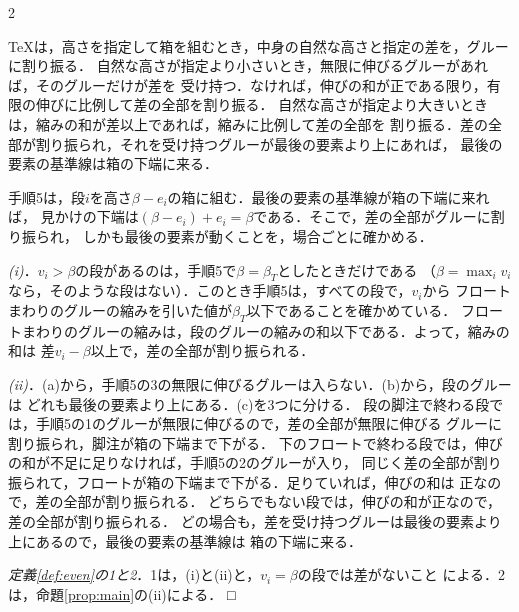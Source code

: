 \documentclass[paper=a4,fontsize=10pt]{jlreq}
\newcommand\kyocho[1]{{\gtfamily\itshape #1}}
\newenvironment{shoumei}{%
  \par\noindent{\gtfamily\sffamily 証明}\hspace{1\zw}\ignorespaces}
  {\unskip\nobreak\hfill □\par\addvspace{.5\baselineskip}}
\begin{document}
\begin{multicols}{2}
\begin{shoumei}
\TeX{}は，高さを指定して箱を組むとき，中身の自然な高さと指定の差を，グルーに割り振る．
自然な高さが指定より小さいとき，無限に伸びるグルーがあれば，そのグルーだけが差を
受け持つ．なければ，伸びの和が正である限り，有限の伸びに比例して差の全部を割り振る．
自然な高さが指定より大きいときは，縮みの和が差以上であれば，縮みに比例して差の全部を
割り振る．差の全部が割り振られ，それを受け持つグルーが最後の要素より上にあれば，
最後の要素の基準線は箱の下端に来る．

手順5は，段$i$を高さ$\beta-e_i$の箱に組む．最後の要素の基準線が箱の下端に来れば，
見かけの下端は$(\beta-e_i)+e_i=\beta$である．そこで，差の全部がグルーに割り振られ，
しかも最後の要素が動くことを，場合ごとに確かめる．

\kyocho{(i)}．$v_i>\beta$の段があるのは，手順5で$\beta=\beta_T$としたときだけである
（$\beta=\max_i v_i$なら，そのような段はない）．このとき手順5は，すべての段で，$v_i$から
フロートまわりのグルーの縮みを引いた値が$\beta_T$以下であることを確かめている．
フロートまわりのグルーの縮みは，段のグルーの縮みの和以下である．よって，縮みの和は
差$v_i-\beta$以上で，差の全部が割り振られる．

\kyocho{(ii)}．(a)から，手順5の3の無限に伸びるグルーは入らない．(b)から，段のグルーは
どれも最後の要素より上にある．(c)を3つに分ける．
段の脚注で終わる段では，手順5の1のグルーが無限に伸びるので，差の全部が無限に伸びる
グルーに割り振られ，脚注が箱の下端まで下がる．
下のフロートで終わる段では，伸びの和が不足に足りなければ，手順5の2のグルーが入り，
同じく差の全部が割り振られて，フロートが箱の下端まで下がる．足りていれば，伸びの和は
正なので，差の全部が割り振られる．
どちらでもない段では，伸びの和が正なので，差の全部が割り振られる．
どの場合も，差を受け持つグルーは最後の要素より上にあるので，最後の要素の基準線は
箱の下端に来る．

\kyocho{定義\ref{def:even}の1と2}．1は，(i)と(ii)と，$v_i=\beta$の段では差がないこと
による．2は，命題\ref{prop:main}の(ii)による．
\end{shoumei}
\end{multicols}
\end{document}

